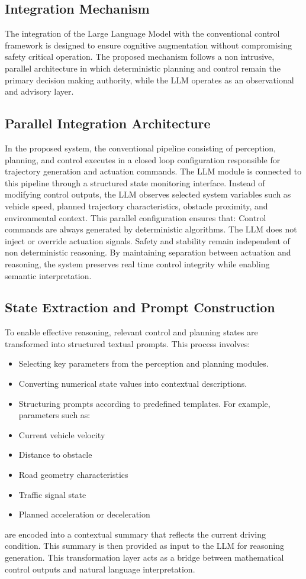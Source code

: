 \documentclass[a4paper,12pt,one side]{report}
\theoremstyle{definition}
\begin{document}
\begin{itemize}
\section{Integration Mechanism}
The integration of the Large Language Model with the conventional control framework is designed to ensure cognitive augmentation without compromising safety critical operation. The proposed mechanism follows a non intrusive, parallel architecture in which deterministic planning and control remain the primary decision making authority, while the LLM operates as an observational and advisory layer.
\subsection{Parallel Integration Architecture}
In the proposed system, the conventional pipeline consisting of perception, planning, and control executes in a closed loop configuration responsible for trajectory generation and actuation commands. The LLM module is connected to this pipeline through a structured state monitoring interface. Instead of modifying control outputs, the LLM observes selected system variables such as vehicle speed, planned trajectory characteristics, obstacle proximity, and environmental context.
This parallel configuration ensures that:
Control commands are always generated by deterministic algorithms. The LLM does not inject or override actuation signals. Safety and stability remain independent of non deterministic reasoning.
By maintaining separation between actuation and reasoning, the system preserves real time control integrity while enabling semantic interpretation.
\subsection{State Extraction and Prompt Construction}
To enable effective reasoning, relevant control and planning states are transformed into structured textual prompts. This process involves:
\begin{itemize}

\item Selecting key parameters from the perception and planning modules.
\item Converting numerical state values into contextual descriptions.
\item Structuring prompts according to predefined templates.
For example, parameters such as:
\item Current vehicle velocity
\item 	Distance to obstacle
\item Road geometry characteristics
\item Traffic signal state
\item Planned acceleration or deceleration
\end{itemize}
are encoded into a contextual summary that reflects the current driving condition. This summary is then provided as input to the LLM for reasoning generation.
This transformation layer acts as a bridge between mathematical control outputs and natural language interpretation.

\end{itemize}
\end{document}
